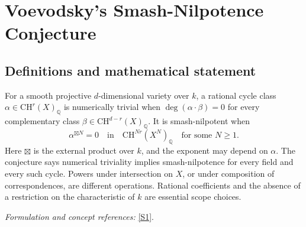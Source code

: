 \documentclass[11pt,a4paper]{article}
\newcommand{\Q}{\mathbb{Q}}
\newcommand{\sref}[2]{\hyperlink{source:#1:#2}{[S#2]}}
\newif\ifshowcatalogue
\newcommand{\cataloguescope}[1]{\ifshowcatalogue
 \paragraph{Exact scope in the supplied catalogue.}
 \begin{quote}\small #1\end{quote}\fi}
\numberwithin{equation}{section}
\begin{document}
\setcounter{section}{0}
\clearpage
\section*{\texorpdfstring{Voevodsky's Smash-Nilpotence Conjecture}{Voevodsky's Smash-Nilpotence Conjecture}}\label{30006776}
\subsection{Definitions and mathematical statement}
For a smooth projective $d$-dimensional variety over $k$, a rational cycle class $\alpha\in\mathrm{CH}^r(X)_{\Q}$ is numerically trivial when
$\deg(\alpha\cdot\beta)=0$ for every complementary class $\beta\in\mathrm{CH}^{d-r}(X)_{\Q}$. It is smash-nilpotent when
\[
 \alpha^{\boxtimes N}=0\quad\text{in}\quad\mathrm{CH}^{Nr}(X^N)_{\Q}
 \quad\text{for some }N\ge1.
\]
Here $\boxtimes$ is the external product over $k$, and the exponent may depend on $\alpha$. The conjecture says numerical triviality implies smash-nilpotence for every field and every such cycle. Powers under intersection on $X$, or under composition of correspondences, are different operations. Rational coefficients and the absence of a restriction on the characteristic of $k$ are essential scope choices.
\par\smallskip\textit{Formulation and concept references:} \sref{30006776}{1}.
\cataloguescope{For every field k, every smooth projective k-variety X of dimension d, every integer 0<=r<=d, and every class alpha in CH\textasciicircum{}r(X)\_Q (codimension-r cycles modulo rational equivalence with rational coefficients), assume deg(alpha.beta)=0 for every beta in CH\textasciicircum{}(d-r)(X)\_Q. Voevodsky's smash-nilpotence assertion is that there exists an integer N>=1, depending on alpha, for which the N-fold EXTERNAL product alpha times ... times alpha is zero in CH\textasciicircum{}(Nr)(X\textasciicircum{}N)\_Q, where X\textasciicircum{}N is the fibre product over k. No algebraic-closure, characteristic-zero or geometric-connectedness hypothesis is imposed; disconnected smooth projective schemes are interpreted on their pure-dimensional components. The reverse implication, smash-nilpotent implies numerically trivial, is known, so this is equality of numerical and smash equivalence for rational cycles. Neither intersection powers on X, composition powers of correspondences, integral coefficients, nor a uniform or computable exponent replaces this assertion.}
\end{document}
